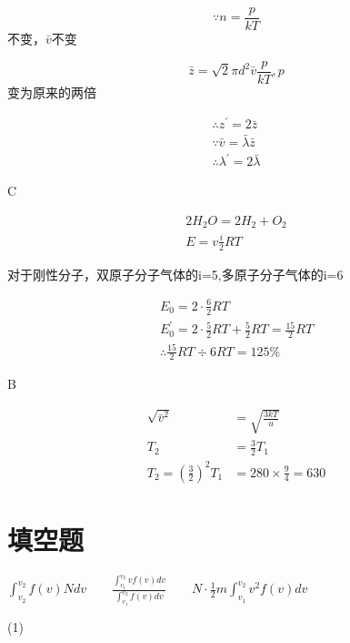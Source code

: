 \documentclass[b5paper,opensource]{./template/qyxf-book}
\begin{document}
$$
\because n = \frac { p } { k T }
$$不变，$ \bar { v }$不变

$$
\bar { z } = \sqrt { 2 } \pi d ^ { 2 } \bar { v } \frac { p } { k T },p
$$变为原来的两倍

$$
\begin{array} { l } { \therefore z ^ { \prime } = 2 \bar { z } } \\ { \because \bar { v } = \bar { \lambda } \bar { z } } \\ { \therefore \lambda ^ { \prime } = 2 \bar { \lambda } } \end{array}
$$

C

\solve

$$
\begin{array} { l } { 2 H _ { 2 } O = 2 H _ { 2 } + O _ { 2 } } \\ { E = v \frac { i } { 2 } R T } \end{array}
$$

对于刚性分子，双原子分子气体的i=5,多原子分子气体的i=6

$$
\begin{array} { l } E _ { 0 } = 2 \cdot \frac { 6 } { 2 } R T \\ E _ { 0 } ^ { \prime } = 2 \cdot \frac { 5 } { 2 } R T + \frac { 5 } { 2 } R T = \frac { 15 } { 2 } R T \\ \therefore \frac { 15 } { 2 } R T \div 6 R T = 125 \% \end{array}
$$

B

\solve

$$
\begin{aligned} \sqrt { \bar { v } ^ { 2 } } & = \sqrt { \frac { 3 k T } { u } } \\ T _ { 2 } & = \frac { 3 } { 2 } T _ { 1 } \\ T _ { 2 } = \left( \frac { 3 } { 2 } \right) ^ { 2 } T _ { 1 } & = 280 \times \frac { 9 } { 4 } = 630 \end{aligned}
$$
\section{填空题}
$
\int _ { v _ { 2 } } ^ { v _ { 2 } } f ( v ) N d v
\qquad
\frac { \int _ { v _ { 1 } } ^ { v _ { 2 } } v f ( v ) d v } { \int _ { v _ { 1 } } ^ { v _ { 2 } } f ( v ) d v }
\qquad
N \cdot \frac { 1 } { 2 } m \int _ { v _ { 1 } } ^ { v _ { 2 } } v ^ { 2 } f ( v ) d v
$

\solve
(1)
\end{document}
